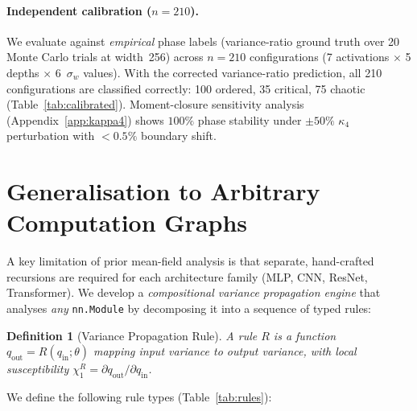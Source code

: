 \documentclass[10pt]{article}
\newtheorem{definition}[theorem]{Definition}
\begin{document}
\paragraph{Independent calibration ($n=210$).}
We evaluate against \emph{empirical} phase labels (variance-ratio ground truth over 20 Monte Carlo trials at width~256) across $n=210$ configurations (7 activations $\times$ 5 depths $\times$ 6~$\sigma_w$ values).
With the corrected variance-ratio prediction, all 210 configurations are classified correctly: 100 ordered, 35 critical, 75 chaotic (Table~\ref{tab:calibrated}).
Moment-closure sensitivity analysis (Appendix~\ref{app:kappa4}) shows $100\%$ phase stability under $\pm 50\%$ $\kappa_4$ perturbation with $<0.5\%$ boundary shift.

\section{Generalisation to Arbitrary Computation Graphs}
\label{sec:arbitrary-graphs}

A key limitation of prior mean-field analysis is that separate, hand-crafted recursions are required for each architecture family (MLP, CNN, ResNet, Transformer).
We develop a \emph{compositional variance propagation engine} that analyses \emph{any} \texttt{nn.Module} by decomposing it into a sequence of typed rules:

\begin{definition}[Variance Propagation Rule]
A rule $R$ is a function $q_{\mathrm{out}} = R(q_{\mathrm{in}}; \theta)$ mapping input variance to output variance, with local susceptibility $\chi_1^R = \partial q_{\mathrm{out}}/\partial q_{\mathrm{in}}$.
\end{definition}

We define the following rule types (Table~\ref{tab:rules}):
\end{document}

